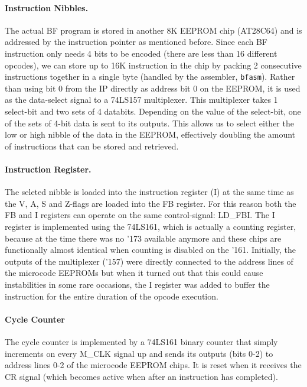 \paragraph{Instruction Nibbles.} The actual BF program is stored in another 8K EEPROM chip (AT28C64) and is addressed by the instruction pointer as mentioned before. Since each BF instruction only needs 4 bits to be encoded (there are less than 16 different opcodes), we can store up to 16K instruction in the chip by packing 2 consecutive instructions together in a single byte (handled by the assembler, \texttt{bfasm}). Rather than using bit 0 from the IP directly as address bit 0 on the EEPROM, it is used as the data-select signal to a 74LS157 multiplexer. This multiplexer takes 1 select-bit and two sets of 4 databits. Depending on the value of the select-bit, one of the sets of 4-bit data is sent to its outputs. This allows us to select either the low or high nibble of the data in the EEPROM, effectively doubling the amount of instructions that can be stored and retrieved.

\paragraph{Instruction Register.} The seleted nibble is loaded into the instruction register (I) at the same time as the V, A, S and Z-flags are loaded into the FB register. For this reason both the FB and I registers can operate on the same control-signal: LD\_FBI. The I register is implemented using the 74LS161, which is actually a counting register, because at the time there was no '173 available anymore and these chips are functionally almost identical when counting is disabled on the '161. Initially, the outputs of the multiplexer ('157) were directly connected to the address lines of the microcode EEPROMs but when it turned out that this could cause instabilities in some rare occasions, the I register was added to buffer the instruction for the entire duration of the opcode execution.
 
\paragraph{Cycle Counter} The cycle counter is implemented by a 74LS161 binary counter that simply increments on every M\_CLK signal up and sends its outputs (bits 0-2) to address lines 0-2 of the microcode EEPROM chips. It is reset when it receives the CR signal (which becomes active when after an instruction has completed).



